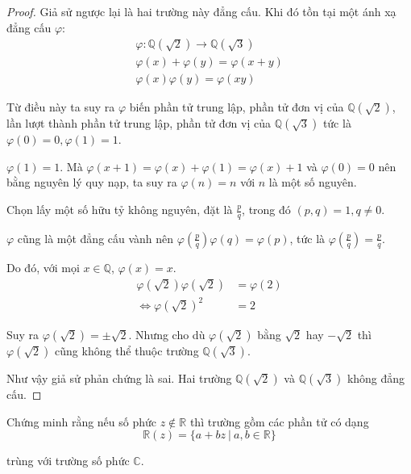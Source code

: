 \documentclass[class=linearalgebra,crop=false]{standalone}
\renewcommand{\phi}{\varphi}
\begin{document}
\begin{proof}Giả sử ngược lại là hai trường này đẳng cấu. Khi đó tồn tại một ánh xạ đẳng cấu $\phi$:
    \begin{gather*}
        \phi: \mathbb{Q}(\sqrt{2})\rightarrow \mathbb{Q}(\sqrt{3}) \\
        \phi(x) + \phi(y) = \phi(x + y) \\
        \phi(x)\phi(y) = \phi(xy)
    \end{gather*}
    \par Từ điều này ta suy ra $\phi$ biến phần tử trung lập, phần tử đơn vị của $\mathbb{Q}(\sqrt{2})$, lần lượt thành phần tử trung lập, phần tử đơn vị của $\mathbb{Q}(\sqrt{3})$ tức là $\phi(0) = 0, \phi(1) = 1$.
    \par $\phi(1) = 1$. Mà $\phi(x + 1) = \phi(x) + \phi(1) = \phi(x) + 1$ và $\phi(0) = 0$ nên bằng nguyên lý quy nạp, ta suy ra $\phi(n) = n$ với $n$ là một số nguyên.
    \bigskip
    \par Chọn lấy một số hữu tỷ không nguyên, đặt là $\frac{p}{q}$, trong đó $(p, q) = 1, q\ne 0$.
    \par $\phi$ cũng là một đẳng cấu vành nên $\phi\left(\frac{p}{q}\right)\phi(q) = \phi(p)$, tức là $\phi(\frac{p}{q}) = \frac{p}{q}$.
    \par Do đó, với mọi $x\in\mathbb{Q}$, $\phi(x) = x$.
    \bigskip
    \begin{align*}
        \phi(\sqrt{2})\phi(\sqrt{2})&= \phi(2) \\
        \Leftrightarrow \phi(\sqrt{2})^{2}&= 2
    \end{align*}
    \par Suy ra $\phi(\sqrt{2}) = \pm\sqrt{2}$. Nhưng cho dù $\phi(\sqrt{2})$ bằng $\sqrt{2}$ hay $-\sqrt{2}$ thì $\phi(\sqrt{2})$ cũng không thể thuộc trường $\mathbb{Q}(\sqrt{3})$.
    \par Như vậy giả sử phản chứng là sai. Hai trường $\mathbb{Q}(\sqrt{2})$ và $\mathbb{Q}(\sqrt{3})$ không đẳng cấu.
\end{proof}

\begin{exercise}Chứng minh rằng nếu số phức $z\not\in\mathbb{R}$ thì trường gồm các phần tử có dạng
    \[ \mathbb{R}(z) = \{ a + bz\ |\ a, b\in\mathbb{R} \} \]
    \par trùng với trường số phức $\mathbb{C}$.
\end{exercise}
\end{document}
